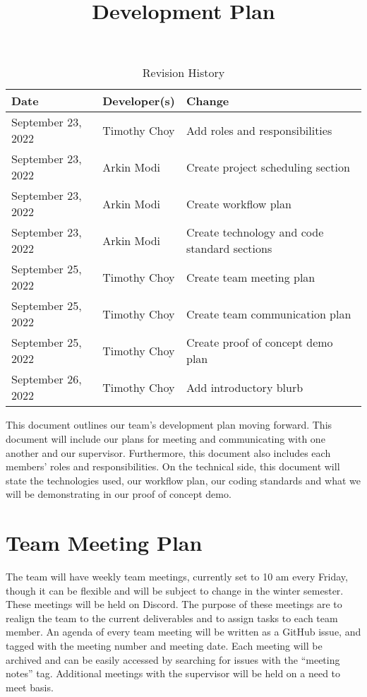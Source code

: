 \documentclass{article}
\title{Development Plan\\\progname}
\author{\authname}
\date{}
\begin{document}
\begin{table}[hp]
\caption{Revision History} \label{TblRevisionHistory}
\begin{tabularx}{\textwidth}{llX}
\toprule
\textbf{Date} & \textbf{Developer(s)} & \textbf{Change}\\
\midrule
September 23, 2022 & Timothy Choy & Add roles and responsibilities\\
September 23, 2022 & Arkin Modi & Create project scheduling section\\
September 23, 2022 & Arkin Modi & Create workflow plan\\
September 23, 2022 & Arkin Modi & Create technology and code standard sections\\
September 25, 2022 & Timothy Choy & Create team meeting plan\\
September 25, 2022 & Timothy Choy & Create team communication plan\\
September 25, 2022 & Timothy Choy & Create proof of concept demo plan\\
September 26, 2022 & Timothy Choy & Add introductory blurb\\
\bottomrule
\end{tabularx}
\end{table}

\newpage

\maketitle

This document outlines our team's development plan moving forward. This document will 
include our plans for meeting and communicating with one another and our supervisor. 
Furthermore, this document also includes each members' roles and responsibilities. On 
the technical side, this document will state the technologies used, our workflow plan, 
our coding standards and what we will be demonstrating in our proof of concept demo.

\section{Team Meeting Plan}

The team will have weekly team meetings, currently set to 10 am every Friday, though it can be 
flexible and will be subject to change in the winter semester. These meetings will be held on 
Discord. The purpose of these meetings are to realign the team to the current deliverables and to 
assign tasks to each team member. An agenda of every team meeting will be written as a GitHub 
issue, and tagged with the meeting number and meeting date. Each meeting will be archived and can 
be easily accessed by searching for issues with the ``meeting notes'' tag. Additional meetings with 
the supervisor will be held on a need to meet basis.
\end{document}
